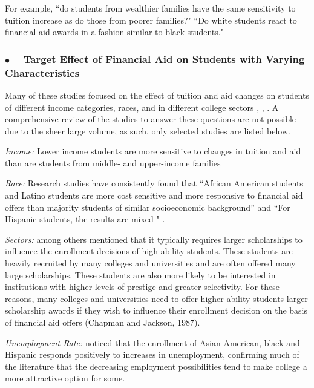 \documentclass[12pt,english]{report}
\begin{document}
For example, ``do students from wealthier families have the same sensitivity to
tuition increase as do those from poorer families?"  ``Do white students react
to financial aid awards in a fashion similar to black students."

\subsubsection{$\bullet \quad$  Target Effect of Financial Aid on Students with
Varying Characteristics }
Many of these studies focused on the effect of tuition and aid changes on
students of different income categories, races, and in different college
sectors \citep{Jackson1978}, \citep{Braunstein1999}, \citep{Heller1997}.  A
comprehensive review of the studies to answer these questions are not possible
due to the sheer large volume, as such, only selected studies are listed below.


\vspace{0.15in}
\noindent \textit{Income: } Lower income students are more sensitive to changes
in tuition and aid than are students from middle- and upper-income families
\citep{Crouse2015}

\vspace{0.25in}
\noindent  \textit{Race: }  Research studies have consistently found that
``African American students and Latino students are more cost sensitive and
more responsive to financial aid offers than majority students of similar
socioeconomic background''  and ``For Hispanic students, the results are mixed
" \citet{Hossler1989}.

\vspace{0.25in}
\noindent \textit{Sectors: }  \citet{Heller1999} among others mentioned that
it typically requires larger scholarships to influence the enrollment decisions
of high-ability students.  These students are heavily recruited by many
colleges and universities and are often offered many large scholarships. These
students are also more likely to be interested in institutions with higher
levels of prestige and greater selectivity.  For these reasons, many colleges
and universities need to offer higher-ability students larger scholarship
awards if they wish to influence their enrollment decision on the basis of
financial aid offers (Chapman and Jackson, 1987).

\vspace{0.25in}
\noindent \textit{Unemployment Rate:}  \citet{Heller1999} noticed that the
enrollment of Asian American, black and Hispanic responds positively to
increases in unemployment, confirming much of the literature that the
decreasing employment possibilities tend to make college a more attractive
option for some.
\end{document}
